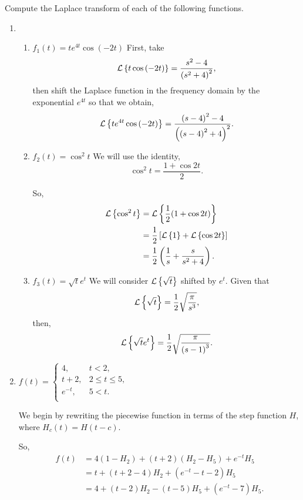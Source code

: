 \documentclass[../hw7]{subfiles}
\begin{document}
Compute the Laplace transform of each of the following functions.
\begin{enumerate}[label= (\alph*)]
    
    \item \begin{enumerate}[label= (\roman*)]
        
        \item $f_1(t)=te^{4t}\cos{(-2t)}$
        First, take \[\mathcal{L}\left\{t\cos{(-2t)}\right\}=\frac{s^2-4}{{(s^2+4)}^2},\] then shift the Laplace function in the frequency domain by the exponential $e^{4t}$ so that we obtain, \[\mathcal{L}\left\{te^{4t}\cos{(-2t)}\right\}=\frac{{(s-4)}^2-4}{{\left( {(s-4)}^2+4 \right)}^2}.\]
        
        \item $f_2(t)=\cos^2{t}$
        We will use the identity, \[\cos^2{t}=\frac{1+\cos{2t}}{2}.\]
        
        So,
        \begin{align*}
            \mathcal{L}\left\{\cos^2{t}\right\}&=\mathcal{L}\left\{\frac{1}{2}(1+\cos{2t})\right\} \\
            &= \frac{1}{2}\left[ \mathcal{L}\left\{1\right\}+\mathcal{L}\left\{\cos{2t}\right\} \right] \\
            &= \frac{1}{2}\left( \frac{1}{s}+\frac{s}{s^2+4} \right). \\
        \end{align*}

        \item $f_3(t)=\sqrt{t}e^t$
        We will consider $\mathcal{L}\left\{\sqrt{t}\right\}$ shifted by $e^t$.
        Given that \[\mathcal{L}\left\{\sqrt{t}\right\}=\frac{1}{2}\sqrt{\frac{\pi}{s^3}},\]
        then, \[\mathcal{L}\left\{\sqrt{t}e^t\right\}=\frac{1}{2}\sqrt{\frac{\pi}{{(s-1)}^3}}.\]

    \end{enumerate}
    
    \item $f(t)=\begin{cases}
        4, & t<2, \\
        t+2, & 2\leq t \leq 5, \\
        e^{-t}, & 5<t. \\
    \end{cases}$

    We begin by rewriting the piecewise function in terms of the step function $H$, where $H_c(t)=H(t-c)$.

    So,
    \begin{align*}
        f(t)&=4(1-H_2)+(t+2)(H_2-H_5)+e^{-t}H_5\\
        &=t+(t+2-4)H_2+(e^{-t}-t-2)H_5\\
        &=4+(t-2)H_2-(t-5)H_5+(e^{-t}-7)H_5.\\
    \end{align*}


\end{enumerate}
\end{document}
